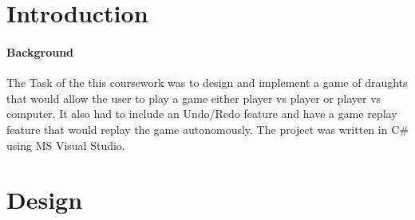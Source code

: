 \documentclass[10pt, a4paper]{article}
\title{\mytitle}
\author{\myauthor\hspace{1em}\\\contact\\Edinburgh Napier University\hspace{0.5em}-\hspace{0.5em}\mymodule}
\date{}
\begin{document}
    \maketitle
    \begin{abstract}
The objective of this coursework was to demonstrate understanding of Algorithms and Data Structures and apply it to a real-world project. The task was to implement a game of draughts with various additional features. This was carried out successfully with a fully working game of draughts with many additional features.
    \end{abstract}
    
    
    
    \section{Introduction}
    \paragraph{Background}
The Task of the this coursework was to design and implement a game of draughts that would allow the user to play a game either player vs player or player vs computer. It also had to include an Undo/Redo feature and have a game replay feature that would replay the game autonomously. The project was written in C\# using MS Visual Studio.
    
   
	
	\section{Design}
\end{document}
